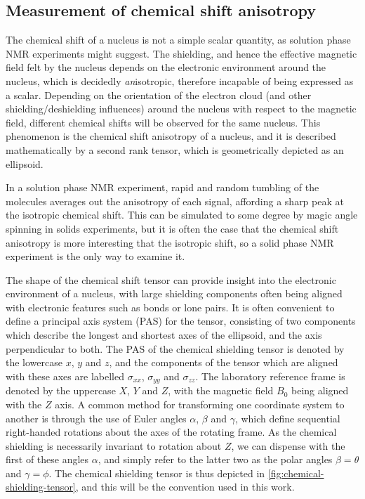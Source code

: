 \begin{refsection}
\subsection{Measurement of chemical shift anisotropy}
The chemical shift of a nucleus is not a simple scalar quantity, as solution phase NMR experiments might suggest.
The shielding, and hence the effective magnetic field felt by the nucleus depends on the electronic environment around the nucleus, which is decidedly \emph{an}isotropic, therefore incapable of being expressed as a scalar.
Depending on the orientation of the electron cloud (and other shielding/deshielding influences) around the nucleus with respect to the magnetic field, different chemical shifts will be observed for the same nucleus.
This phenomenon is the chemical shift anisotropy of a nucleus, and it is described mathematically by a second rank tensor, which is geometrically depicted as an ellipsoid.

In a solution phase NMR experiment, rapid and random tumbling of the molecules averages out the anisotropy of each signal, affording a sharp peak at the isotropic chemical shift.
This can be simulated to some degree by magic angle spinning in solids experiments, but it is often the case that the chemical shift anisotropy is more interesting that the isotropic shift, so a solid phase NMR experiment is the only way to examine it.

The shape of the chemical shift tensor can provide insight into the electronic environment of a nucleus, with large shielding components often being aligned with electronic features such as bonds or lone pairs.
It is often convenient to define a principal axis system (PAS) for the tensor, consisting of two components which describe the longest and shortest axes of the ellipsoid, and the axis perpendicular to both.
The PAS of the chemical shielding tensor is denoted by the lowercase $x$, $y$ and $z$, and the components of the tensor which are aligned with these axes are labelled $\sigma_{xx}$, $\sigma_{yy}$ and $\sigma_{zz}$.
The laboratory reference frame is denoted by the uppercase $X$, $Y$ and $Z$, with the magnetic field $B_0$ being aligned with the $Z$ axis.
A common method for transforming one coordinate system to another is through the use of Euler angles $\alpha$, $\beta$ and $\gamma$, which define sequential right-handed rotations about the axes of the rotating frame.
As the chemical shielding is necessarily invariant to rotation about $Z$, we can dispense with the first of these angles $\alpha$, and simply refer to the latter two as the polar angles $\beta = \theta$ and $\gamma = \phi$.
The chemical shielding tensor is thus depicted in \cref{fig:chemical-shielding-tensor}, and this will be the convention used in this work.


\end{refsection}
